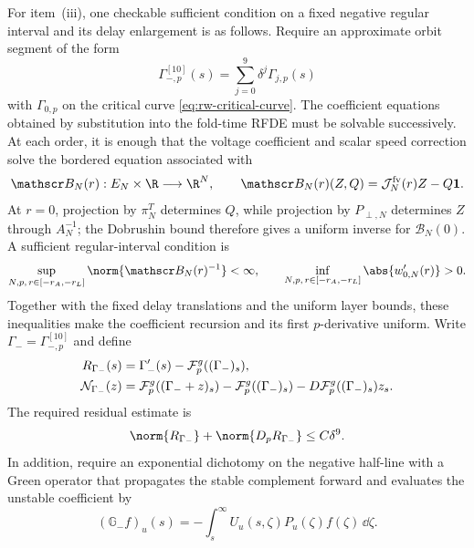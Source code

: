 \begin{remark}
For item~\textup{(iii)}, one checkable sufficient condition on a fixed
negative regular interval and its delay enlargement is as follows.  Require
an approximate orbit segment of the form
\begin{equation}
 \Gamma_{-,p}^{[10]}(s)=\sum_{j=0}^{9}\delta^j\Gamma_{j,p}(s)
 \label{eq:supp-negative-slow-expansion}
\end{equation}
with \(\Gamma_{0,p}\) on the critical curve
\cref{eq:rw-critical-curve}.  The coefficient equations obtained by
substitution into the fold-time RFDE must be solvable successively.  At each
order, it is enough that the voltage coefficient and scalar speed correction
solve the bordered equation associated with
\begin{equation}
 \mathscr B_N(r):E_N\times\R\longrightarrow\R^N,
 \qquad
 \mathscr B_N(r)(Z,Q)=\mathcal J_N^{\rm fv}(r)Z-Q\mathbf1.
 \label{eq:supp-negative-bordered-map}
\end{equation}
At \(r=0\), projection by \(\pi_N^T\) determines \(Q\), while projection by
\(P_{\perp,N}\) determines \(Z\) through \(A_N^{-1}\); the Dobrushin bound
therefore gives a uniform inverse for \(\mathscr B_N(0)\).  A sufficient
regular-interval condition is
\[
 \sup_{N,p,\,r\in[-r_A,-r_L]}
 \norm{\mathscr B_N(r)^{-1}}<\infty,
 \qquad
 \inf_{N,p,\,r\in[-r_A,-r_L]}\abs{w_{0,N}'(r)}>0.
\]
Together with the fixed delay translations and the uniform layer bounds,
these inequalities make the coefficient recursion and its first
\(p\)-derivative uniform.  Write \(\Gamma_-=\Gamma_{-,p}^{[10]}\) and define
\begin{align}
 R_{\Gamma_-}(s)
 &=\Gamma_-'(s)-\mathcal F_p^g((\Gamma_-)_s),\notag\\
 \mathcal N_{\Gamma_-}(z)
 &=\mathcal F_p^g((\Gamma_-+z)_s)
   -\mathcal F_p^g((\Gamma_-)_s)
   -D\mathcal F_p^g((\Gamma_-)_s)z_s.
 \label{eq:supp-negative-residual-definition}
\end{align}
The required residual estimate is
\begin{equation}
 \norm{R_{\Gamma_-}}+\norm{D_pR_{\Gamma_-}}\le C\delta^9.
 \label{eq:supp-negative-residual}
\end{equation}
In addition, require an exponential dichotomy on the negative half-line with
a Green operator that propagates the stable complement forward and evaluates
the unstable coefficient by
\begin{equation}
 (\mathbb G_-f)_u(s)
 =-\int_s^\infty U_u(s,\zeta)P_u(\zeta)f(\zeta)\,\dd\zeta.
 \label{eq:supp-half-line-green}
\end{equation}

\end{remark}
